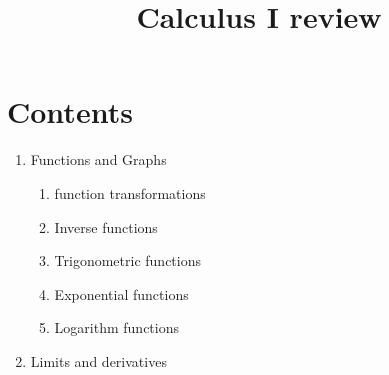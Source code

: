 \title{Calculus I review}

\maketitle
\section{Contents}
\begin{enumerate}
    \item Functions and Graphs
        \begin{enumerate}
            \items Basic classes of functions
                \begin{enumerate}
                    \item Linear
                    \item polynomials
                    \item Algebraic
                    \item piece-wise defined
                    \item Transcendentals
                    \item power
                \end{enumerate}
            \item function transformations
            \item Inverse functions
            \item Trigonometric functions
            \item Exponential functions
            \item Logarithm functions
            \items
        \end{enumerate}
   \item Limits and derivatives
 \end{enumerate}




